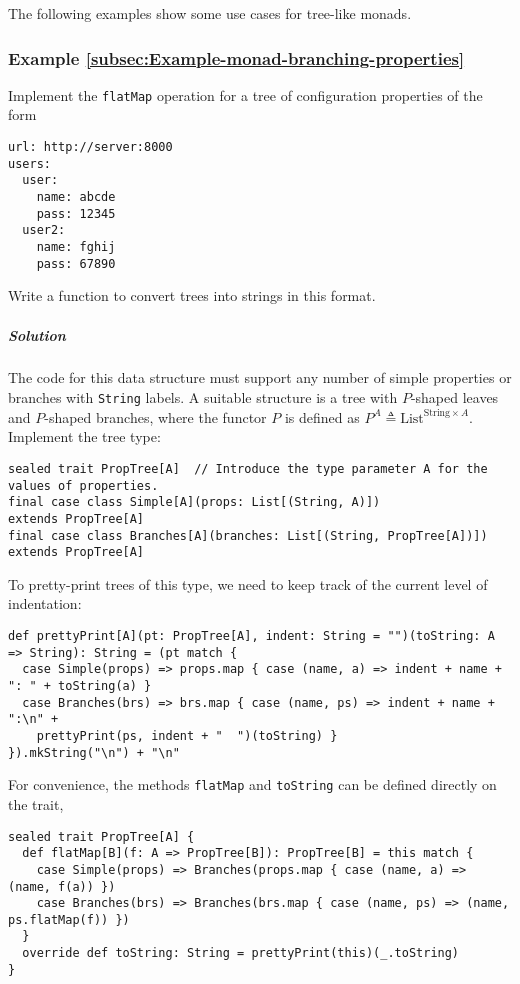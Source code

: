 The following examples show some use cases for tree-like monads.

\subsubsection{Example \label{subsec:Example-monad-branching-properties}\ref{subsec:Example-monad-branching-properties}}

Implement the \lstinline!flatMap! operation for a tree of configuration
properties of the form
\begin{lstlisting}
url: http://server:8000
users:
  user:
    name: abcde
    pass: 12345
  user2:
    name: fghij
    pass: 67890
\end{lstlisting}
Write a function to convert trees into strings in this format.

\subparagraph{Solution}

The code for this data structure must support any number of simple
properties or branches with \lstinline!String! labels. A suitable
structure is a tree with $P$-shaped leaves and $P$-shaped branches,
where the functor $P$ is defined as $P^{A}\triangleq\text{List}^{\text{String}\times A}$.
Implement the tree type:
\begin{lstlisting}
sealed trait PropTree[A]  // Introduce the type parameter A for the values of properties.
final case class Simple[A](props: List[(String, A)])                  extends PropTree[A]
final case class Branches[A](branches: List[(String, PropTree[A])])   extends PropTree[A]
\end{lstlisting}
To pretty-print trees of this type, we need to keep track of the current
level of indentation:
\begin{lstlisting}
def prettyPrint[A](pt: PropTree[A], indent: String = "")(toString: A => String): String = (pt match {
  case Simple(props) => props.map { case (name, a) => indent + name + ": " + toString(a) }
  case Branches(brs) => brs.map { case (name, ps) => indent + name + ":\n" +
    prettyPrint(ps, indent + "  ")(toString) }
}).mkString("\n") + "\n"
\end{lstlisting}
For convenience, the methods \lstinline!flatMap! and \lstinline!toString!
can be defined directly on the trait,
\begin{lstlisting}
sealed trait PropTree[A] {
  def flatMap[B](f: A => PropTree[B]): PropTree[B] = this match {
    case Simple(props) => Branches(props.map { case (name, a) => (name, f(a)) })
    case Branches(brs) => Branches(brs.map { case (name, ps) => (name, ps.flatMap(f)) })
  }
  override def toString: String = prettyPrint(this)(_.toString)
}
\end{lstlisting}

